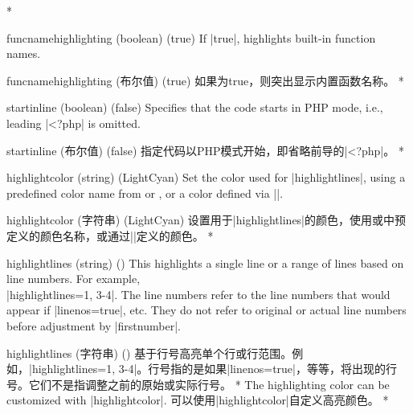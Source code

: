 \begin{optionlist} 
\begin{paracol}{2}
\switchcolumn[0]*%
\item[funcnamehighlighting (boolean) (true)] 
If |true|, highlights built-in function names.
\switchcolumn
\item[funcnamehighlighting (布尔值) (true)] 
如果为true，则突出显示内置函数名称。
\switchcolumn[0]*%
\item[startinline (boolean) (false)] 
Specifies that the code starts in PHP mode, i.e., leading |<?php| is omitted.
\switchcolumn
\item[startinline (布尔值) (false)] 
指定代码以PHP模式开始，即省略前导的|<?php|。
    \switchcolumn[0]*%
\item[highlightcolor (string) (LightCyan)]
Set the color used for |highlightlines|, using a predefined color name from  or , or a color defined via |\definecolor|.
\switchcolumn
\item[highlightcolor (字符串) (LightCyan)]
设置用于|highlightlines|的颜色，使用或中预定义的颜色名称，或通过|\definecolor|定义的颜色。
\switchcolumn[0]*%

\item[highlightlines (string) (\meta{none})]
This highlights a single line or a range of lines based on line numbers.  For example, \\|highlightlines={1, 3-4}|.  The line numbers refer to the line numbers that would appear if |linenos=true|, etc.  They do not refer to original or actual line numbers before adjustment by |firstnumber|.
\switchcolumn
\item[highlightlines (字符串) (\meta{无})]
基于行号高亮单个行或行范围。例如，|highlightlines={1, 3-4}|。行号指的是如果|linenos=true|，等等，将出现的行号。它们不是指调整之前的原始或实际行号。
\switchcolumn[0]*%
The highlighting color can be customized with |highlightcolor|.
\switchcolumn
可以使用|highlightcolor|自定义高亮颜色。
\switchcolumn[0]*%


\end{paracol}
\end{optionlist}
